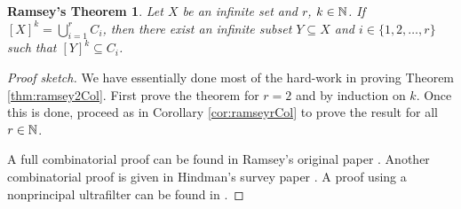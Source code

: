\documentclass[12pt]{article}
\theoremstyle{plain}
\newtheorem*{ramsey}{Ramsey's Theorem}
\begin{document}
\begin{ramsey}
  Let $X$ be an infinite set and $r$, $k \in \mathbb{N}$.
  If $[X]^k = \bigcup_{i=1}^r C_i$, then there exist an infinite subset
  $Y \subseteq X$ and $i \in \{1, 2, \ldots, r\}$ such that $[Y]^k
  \subseteq C_i$.
\end{ramsey}
\begin{proof}[Proof sketch]
  We have essentially done most of the hard-work in proving Theorem
  \ref{thm:ramsey2Col}. 
  First prove the theorem for $r = 2$ and by induction on $k$.
  Once this is done, proceed as in Corollary \ref{cor:ramseyrCol} to
  prove the result for all $r \in \mathbb{N}$.

  A full combinatorial proof can be found in Ramsey's original paper
  \cite[Theorem A]{Ramsey:1930uq}. Another combinatorial proof is
  given in Hindman's survey paper \cite[Theorem ??]{Hindman:1979fk}.
  A proof using a nonprincipal ultrafilter can be found in
  \cite[Theorem 18.2]{Hindman:1998fk}.

\end{proof}



\end{document}
